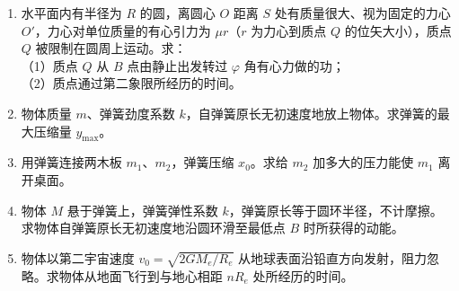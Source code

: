 \documentclass[12pt]{article}
\begin{document}
\begin{enumerate}[label=\textbf{例\arabic*.}, leftmargin=*]
\item 水平面内有半径为 $R$ 的圆，离圆心 $O$ 距离 $S$ 处有质量很大、视为固定的力心 $O'$，力心对单位质量的有心引力为 $\mu r$（$r$ 为力心到质点 $Q$ 的位矢大小），质点 $Q$ 被限制在圆周上运动。求：\\
（1）质点 $Q$ 从 $B$ 点由静止出发转过 $\varphi$ 角有心力做的功；\\
（2）质点通过第二象限所经历的时间。

\item 物体质量 $m$、弹簧劲度系数 $k$，自弹簧原长无初速度地放上物体。求弹簧的最大压缩量 $y_{\max}$。

\item 用弹簧连接两木板 $m_1$、$m_2$，弹簧压缩 $x_0$。求给 $m_2$ 加多大的压力能使 $m_1$ 离开桌面。

\item 物体 $M$ 悬于弹簧上，弹簧弹性系数 $k$，弹簧原长等于圆环半径，不计摩擦。求物体自弹簧原长无初速度地沿圆环滑至最低点 $B$ 时所获得的动能。

\item 物体以第二宇宙速度 $v_0 = \sqrt{2GM_e/R_e}$ 从地球表面沿铅直方向发射，阻力忽略。求物体从地面飞行到与地心相距 $nR_e$ 处所经历的时间。

\end{enumerate}
\end{document}
